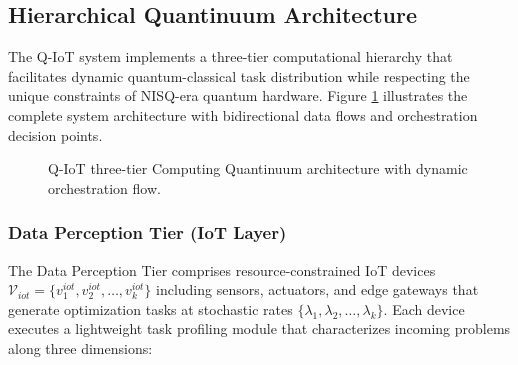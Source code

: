 \documentclass[lettersize,journal]{IEEEtran}
\begin{document}
\subsection{Hierarchical Quantinuum Architecture}
\label{subsec:hierarchy}

The Q-IoT system implements a three-tier computational hierarchy that facilitates dynamic quantum-classical task distribution while respecting the unique constraints of NISQ-era quantum hardware. Figure \ref{fig:architecture} illustrates the complete system architecture with bidirectional data flows and orchestration decision points.

\begin{figure}[t]
\centering
{}
\caption{Q-IoT three-tier Computing Quantinuum architecture with dynamic orchestration flow.}
\label{fig:architecture}
\end{figure}

\subsubsection{Data Perception Tier (IoT Layer)}

The Data Perception Tier comprises resource-constrained IoT devices $\mathcal{V}_{iot} = \{v_1^{iot}, v_2^{iot}, \ldots, v_k^{iot}\}$ including sensors, actuators, and edge gateways that generate optimization tasks at stochastic rates $\{\lambda_1, \lambda_2, \ldots, \lambda_k\}$. Each device executes a lightweight task profiling module that characterizes incoming problems along three dimensions:
\end{document}
